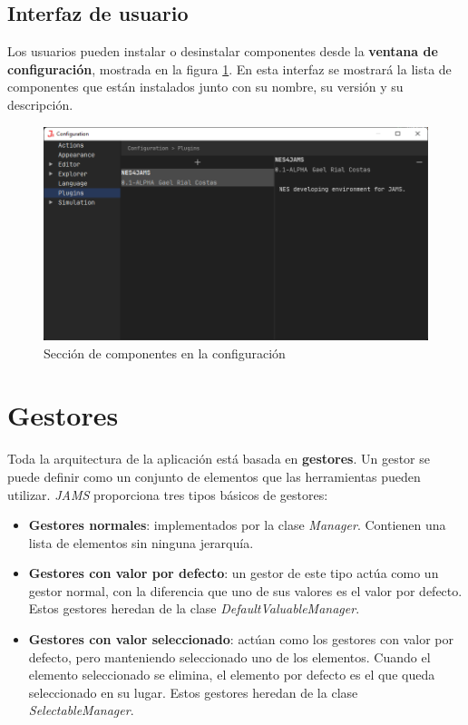 \subsection{Interfaz de usuario}\label{subsec:interfaz-de-usuario}

Los usuarios pueden instalar o desinstalar componentes
desde la \textbf{ventana de configuración}, mostrada en la figura \ref{fig:plugin-ui}.
En esta interfaz se mostrará la lista de componentes
que están instalados junto con su nombre, su versión
y su descripción.

\begin{figure}[h]
    \centering
    \includegraphics[width=\textwidth]{images/componentes/plugin-ui}
    \caption{Sección de componentes en la configuración}
    \label{fig:plugin-ui}
\end{figure}

\section{Gestores}\label{sec:gestores}

Toda la arquitectura de la aplicación está basada en \textbf{gestores}.
Un gestor se puede definir como un conjunto de elementos que las herramientas pueden utilizar.
\textit{JAMS} proporciona tres tipos básicos de gestores:
\begin{itemize}
    \item \textbf{Gestores normales}: implementados por la clase \textit{Manager}.
    Contienen una lista de elementos sin ninguna jerarquía.
    \item \textbf{Gestores con valor por defecto}: un gestor de este tipo actúa
    como un gestor normal, con la diferencia que uno de sus valores es el valor por defecto.
    Estos gestores heredan de la clase \textit{DefaultValuableManager}.
    \item \textbf{Gestores con valor seleccionado}: actúan como los gestores con valor por defecto,
    pero manteniendo seleccionado uno de los elementos.
    Cuando el elemento seleccionado se elimina, el elemento por
    defecto es el que queda seleccionado en su lugar.
    Estos gestores heredan de la clase \textit{SelectableManager}.
\end{itemize}

